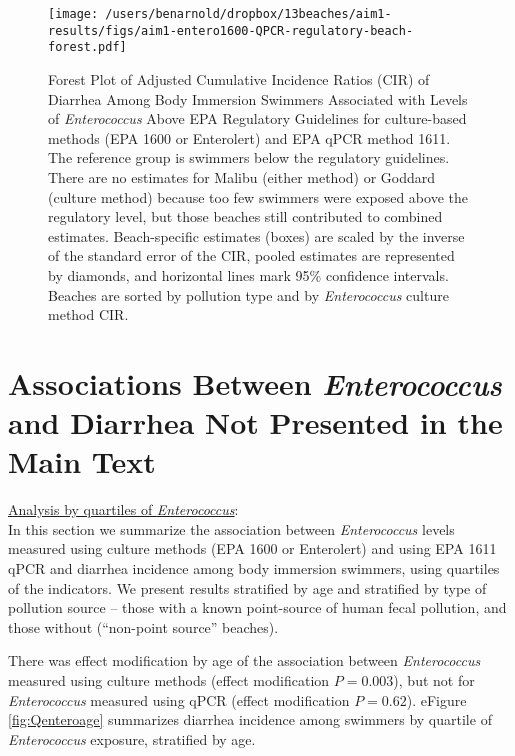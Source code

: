 \documentclass[12pt]{article}\usepackage[]{graphicx}\usepackage[]{color}
\begin{document}
\begin{landscape}
\begin{figure}[h!tb]
\begin{center}
\texttt{[image: /users/benarnold/dropbox/13beaches/aim1-results/figs/aim1-entero1600-QPCR-regulatory-beach-forest.pdf]}
\caption{Forest Plot of Adjusted Cumulative Incidence Ratios (CIR) of Diarrhea Among Body Immersion Swimmers Associated with  Levels of \emph{Enterococcus} Above EPA Regulatory Guidelines for culture-based methods (EPA 1600 or Enterolert) and EPA qPCR method 1611. The reference group is swimmers below the regulatory guidelines. There are no estimates for Malibu (either method) or Goddard (culture method) because too few swimmers were exposed above the regulatory level, but those beaches still contributed to combined estimates. Beach-specific estimates (boxes) are scaled by the inverse of the standard error of the CIR, pooled estimates are represented by diamonds, and horizontal lines mark 95\% confidence intervals. Beaches are sorted by pollution type and by \textit{Enterococcus} culture method CIR.\label{fig:enteroregforest}}
\end{center}
\end{figure}
\end{landscape}

\clearpage
\section{Associations Between \emph{Enterococcus} and Diarrhea Not Presented in the Main Text}

\underline{Analysis by quartiles of \textit{Enterococcus}}: \\
In this section we summarize the association between \emph{Enterococcus} levels measured using culture methods (EPA 1600 or Enterolert) and using EPA 1611 qPCR and diarrhea incidence among body immersion swimmers, using quartiles of the indicators.  We present results stratified by age and stratified by type of pollution source -- those with a known point-source of human fecal pollution, and those without (``non-point source'' beaches).  

There was effect modification by age of the association between \textit{Enterococcus} measured using culture methods (effect modification $P=0.003$), but not for \textit{Enterococcus} measured using qPCR (effect modification $P=0.62$).  eFigure  \ref{fig:Qenteroage} summarizes diarrhea incidence among swimmers by quartile of \textit{Enterococcus} exposure, stratified by age.
\end{document}
